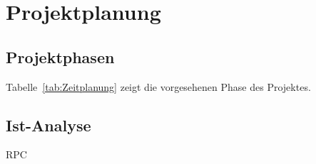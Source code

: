 \section{Projektplanung}
\label{sec:Projektplanung}

\subsection{Projektphasen} 
\label{sec:Projektphasen}

Tabelle~\ref{tab:Zeitplanung} zeigt die vorgesehenen Phase des Projektes.
\\ 

\subsection{Ist-Analyse} 
\label{sec:IstAnalyse}
\acs{RPC}